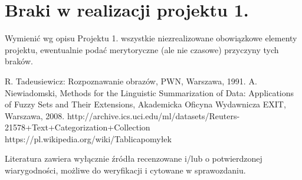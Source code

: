 \documentclass{classrep}
\begin{document}
\section{Braki w realizacji projektu 1.}
Wymienić wg opisu Projektu 1. wszystkie niezrealizowane obowiązkowe elementy projektu, ewentualnie
podać merytoryczne (ale nie czasowe) przyczyny tych braków. 


\begin{thebibliography}{0}
 R. Tadeusiewicz: Rozpoznawanie obrazów, PWN, Warszawa, 1991.  
 A. Niewiadomski, Methods for the Linguistic Summarization of Data: Applications of Fuzzy Sets and Their Extensions, Akademicka Oficyna Wydawnicza EXIT, Warszawa, 2008.
 http://archive.ics.uci.edu/ml/datasets/Reuters-21578+Text+Categorization+Collection
 https://pl.wikipedia.org/wiki/Tablica\textunderscore pomyłek
\end{thebibliography}

Literatura zawiera wyłącznie źródła recenzowane i/lub o potwierdzonej wiarygodności,
możliwe do weryfikacji i cytowane w sprawozdaniu. 
\end{document}
